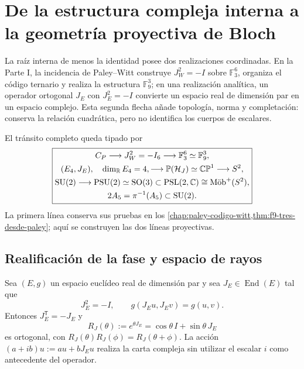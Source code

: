 \section{De la estructura compleja interna a la geometría proyectiva de Bloch}
\label{sec:geometria-proyectiva-bloch-rev2}

La raíz interna de menos la identidad posee dos realizaciones coordinadas. En
la Parte I, la incidencia de Paley--Witt construye
\(J_W^2=-I\) sobre \(\mathbb F_3^6\), organiza el código ternario y realiza
la estructura \(\mathbb F_9^3\); en una realización analítica, un operador
ortogonal \(J_E\) con \(J_E^2=-I\) convierte un espacio real de dimensión
par en un espacio complejo. Esta segunda flecha añade topología, norma y
completación: conserva la relación cuadrática, pero no identifica los cuerpos
de escalares.

El tránsito completo queda tipado por
\begin{equation}
 \boxed{
 \begin{gathered}
 C_P\longrightarrow J_W^2=-I_6
 \longrightarrow \mathbb F_3^6\simeq\mathbb F_9^3,\\
 (E_4,J_E),\quad \dim_{\mathbb R}E_4=4,
 \longrightarrow
 \mathbb P(\mathcal H_J)\simeq\mathbb {CP}^{1}
 \longrightarrow S^2,\\
 \mathrm{SU}(2)\longrightarrow\mathrm{PSU}(2)\simeq\mathrm{SO}(3)
 \subset\mathrm{PSL}(2,\mathbb C)\cong\text{\rmfamily Möb}^{+}(S^2),\\
 2A_5=\pi^{-1}(A_5)\subset\mathrm{SU}(2).
 \end{gathered}}
 \label{eq:cadena-paley-bloch-rev2}
\end{equation}
La primera línea conserva sus pruebas en los
\cref{chap:paley-codigo-witt,thm:f9-tres-desde-paley}; aquí se construyen las
dos líneas proyectivas.

\subsection{Realificación de la fase y espacio de rayos}

Sea \((E,g)\) un espacio euclídeo real de dimensión par y sea
\(J_E\in\operatorname{End}(E)\) tal que
\[
 J_E^2=-I,
 \qquad g(J_Eu,J_Ev)=g(u,v).
\]
Entonces \(J_E^{\mathsf T}=-J_E\) y
\[
 R_J(\theta):=e^{\theta J_E}
 =\cos\theta\,I+\sin\theta\,J_E
\]
es ortogonal, con
\(R_J(\theta)R_J(\phi)=R_J(\theta+\phi)\). La acción
\((a+ib)u:=au+bJ_Eu\) realiza la carta compleja sin utilizar el escalar
\(i\) como antecedente del operador.

